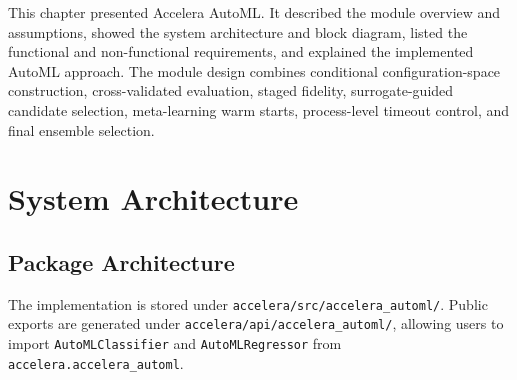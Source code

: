 \documentclass[12pt,a4paper,oneside]{report}
\newcommand{\systemname}{Accelera AutoML}
\newcommand{\modulepath}[1]{\texttt{\footnotesize #1}}
\begin{document}
This chapter presented \systemname{}. It described
the module overview and assumptions, showed the system architecture and block
diagram, listed the functional and non-functional requirements, and explained
the implemented AutoML approach. The module design combines conditional
configuration-space construction, cross-validated evaluation, staged fidelity,
surrogate-guided candidate selection, meta-learning warm starts, process-level
timeout control, and final ensemble selection.

\iffalse
\section{System Architecture}
\label{sec:implementation}

\subsection{Package Architecture}

The implementation is stored under
\modulepath{accelera/src/accelera\_automl/}. Public exports are generated under
\modulepath{accelera/api/accelera\_automl/}, allowing users to import
\texttt{AutoMLClassifier} and \texttt{AutoMLRegressor} from
\modulepath{accelera.accelera\_automl}.
\end{document}

